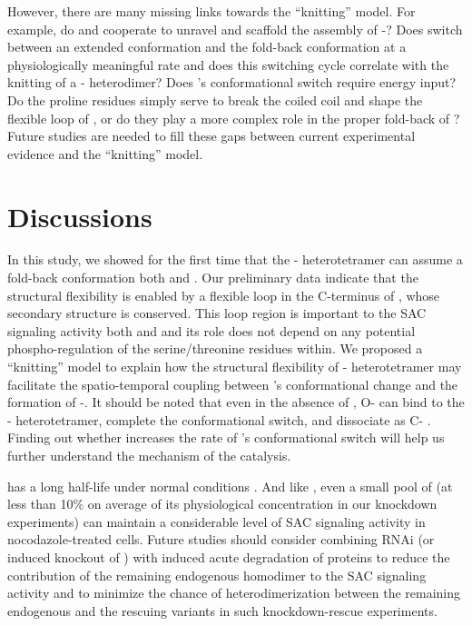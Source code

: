 However, there are many missing links towards the ``knitting'' model. For example, do  and  cooperate to unravel  and scaffold the assembly of -? Does  switch between an extended conformation and the fold-back conformation at a physiologically meaningful rate  and does this switching cycle correlate with the knitting of a - heterodimer? Does 's conformational switch require energy input? Do the proline residues simply serve to break the coiled coil and shape the flexible loop of , or do they play a more complex role in the proper fold-back of ? Future studies are needed to fill these gaps between current experimental evidence and the ``knitting'' model.

\section{Discussions}
\label{Chapter4Discussions}

In this study, we showed for the first time that the - heterotetramer can assume a fold-back conformation both  and . Our preliminary data indicate that the structural flexibility is enabled by a flexible loop in the C-terminus of , whose secondary structure is conserved. This loop region is important to the SAC signaling activity both  and  and its role does not depend on any potential phospho-regulation of the serine/threonine residues within. We proposed a ``knitting'' model to explain how the structural flexibility of - heterotetramer may facilitate the spatio-temporal coupling between 's conformational change and the formation of -. It should be noted that even in the absence of , O- can bind to the - heterotetramer, complete the conformational switch, and dissociate as C-  \cite{Yang2008}. Finding out whether  increases the rate of 's conformational switch will help us further understand the mechanism of the catalysis.

 has a long half-life under normal conditions \cite{MAD1MAD2Half-life}. And like  \cite{Raaijmakers2018, RZZ-MAD1vsBUB1-MAD1_2018, siROD_Zhang2019}, even a small pool of  (at less than 10\% on average of its physiological concentration in our knockdown experiments) can maintain a considerable level of SAC signaling activity in nocodazole-treated cells. Future studies should consider combining RNAi (or induced knockout of ) with induced acute degradation of  proteins to reduce the contribution of the remaining endogenous  homodimer to the SAC signaling activity and to minimize the chance of heterodimerization between the remaining endogenous  and the rescuing  variants in such knockdown-rescue experiments. %

